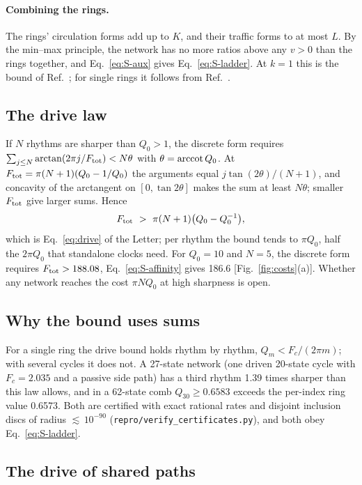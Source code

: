 \paragraph*{Combining the rings.} The rings' circulation forms add up to $K$, and their traffic forms to at most $L$. By the min--max principle, the network has no more ratios above any $v>0$ than the rings together, and Eq.~\eqref{eq:S-aux} gives Eq.~\eqref{eq:S-ladder}. At $k=1$ this is the bound of Ref.~\cite{ohga2023}; for single rings it follows from Ref.~\cite{kolchinsky2026winding}.

\subsection{The drive law}

If $N$ rhythms are sharper than $Q_0>1$, the discrete form requires $\sum_{j\le N}\arctan(2\pi j/F_{\mathrm{tot}})<N\theta$ with $\theta=\operatorname{arccot} Q_0$. At $F_{\mathrm{tot}}=\pi(N+1)(Q_0-1/Q_0)$ the arguments equal $j\tan(2\theta)/(N+1)$, and concavity of the arctangent on $[0,\tan2\theta]$ makes the sum at least $N\theta$; smaller $F_{\mathrm{tot}}$ give larger sums. Hence
\begin{equation}
\Ft\ >\ \pi(N+1)\bigl(Q_0-Q_0^{-1}\bigr),
\label{eq:S-affinity}
\end{equation}
which is Eq.~\eqref{eq:drive} of the Letter; per rhythm the bound tends to $\pi Q_0$, half the $2\pi Q_0$ that standalone clocks need. For $Q_0=10$ and $N=5$, the discrete form requires $F_{\mathrm{tot}}>188.08$, Eq.~\eqref{eq:S-affinity} gives 186.6 [Fig.~\ref{fig:costs}(a)]. Whether any network reaches the cost $\pi NQ_0$ at high sharpness is open.

\subsection{Why the bound uses sums}\label{sec:certificates}

For a single ring the drive bound holds rhythm by rhythm, $Q_m<F_c/(2\pi m)$; with several cycles it does not. A 27-state network (one driven 20-state cycle with $F_c=2.035$ and a passive side path) has a third rhythm 1.39 times sharper than this law allows, and in a 62-state comb $Q_{30}\ge0.6583$ exceeds the per-index ring value 0.6573. Both are certified with exact rational rates and disjoint inclusion discs of radius ${\lesssim}\,10^{-90}$ (\texttt{repro/verify\_certificates.py}), and both obey Eq.~\eqref{eq:S-ladder}.

\subsection{The drive of shared paths}\label{sec:affcost}

